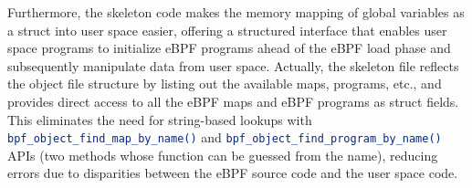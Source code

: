 Furthermore, the skeleton code makes the memory mapping of global variables as a struct into user space easier, offering a structured interface that enables user space programs to initialize eBPF programs ahead of the eBPF load phase and subsequently manipulate data from user space.
Actually, the skeleton file reflects the object file structure by listing out the available maps, programs, etc., and provides direct access to all the eBPF maps and eBPF programs as struct fields. 
This eliminates the need for string-based lookups with \colorbox{backcolour}{\lstinline[style=commandline, language=bash, breaklines=true]|bpf_object_find_map_by_name()|} and \colorbox{backcolour}{\lstinline[style=commandline, language=bash, breaklines=true]|bpf_object_find_program_by_name()|} APIs (two methods whose function can be guessed from the name), reducing errors due to disparities between the eBPF source code and the user space code.